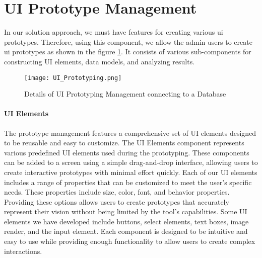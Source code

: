 
\clearpage
\section{UI Prototype Management}
\label{sc:section:prototyping}
In our solution approach, we must have features for creating various \ac{ui} prototypes.
Therefore, using this component, we allow the admin users to create \ac{ui} prototypes as shown in the figure \ref{fig:sc:prototyping}.
It consists of various sub-components for constructing UI elements, data models, and analyzing results.
\begin{figure}[htbp!]
    \centering    
    \texttt{[image: UI\_Prototyping.png]} 
    \caption[Details of UI Prototyping Management]{Details of UI Prototyping Management connecting to a Database}
    \label{fig:sc:prototyping}
\end{figure}

\paragraph{UI Elements}
The prototype management features a comprehensive set of UI elements designed to be reusable and easy to customize. 
The UI Elements component represents various predefined UI elements used during the prototyping. 
These components can be added to a screen using a simple drag-and-drop interface, allowing users to create interactive prototypes with minimal effort quickly.
Each of our UI elements includes a range of properties that can be customized to meet the user's specific needs. 
These properties include size, color, font, and behavior properties. 
Providing these options allows users to create prototypes that accurately represent their vision without being limited by the tool's capabilities.
Some UI elements we have developed include buttons, select elements, text boxes, image render, and the input element. 
Each component is designed to be intuitive and easy to use while providing enough functionality to allow users to create complex interactions. 
